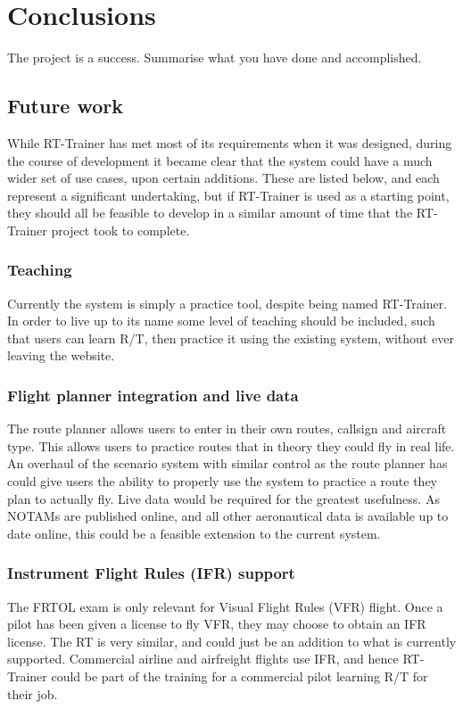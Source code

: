 \chapter{Conclusions}
\label{ch:conclusions}

The project is a success. Summarise what you have done and accomplished.


\section{Future work}
\label{FutureWork}

While RT-Trainer has met most of its requirements when it was designed, during the course of development it became clear that the system could have a much wider set of use cases, upon certain additions. These are listed below, and each represent a significant undertaking, but if RT-Trainer is used as a starting point, they should all be feasible to develop in a similar amount of time that the RT-Trainer project took to complete.

\subsection{Teaching}
Currently the system is simply a practice tool, despite being named RT-Trainer. In order to live up to its name some level of teaching should be included, such that users can learn R/T, then practice it using the existing system, without ever leaving the website.

\subsection{Flight planner integration and live data}
The route planner allows users to enter in their own routes, callsign and aircraft type. This allows users to practice routes that in theory they could fly in real life. An overhaul of the scenario system with similar control as the route planner has could give users the ability to properly use the system to practice a route they plan to actually fly. Live data would be required for the greatest usefulness. As NOTAMs are published online, and all other aeronautical data is available up to date online, this could be a feasible extension to the current system.

\subsection{Instrument Flight Rules (IFR) support}
The FRTOL exam is only relevant for Visual Flight Rules (VFR) flight. Once a pilot has been given a license to fly VFR, they may choose to obtain an IFR license. The RT is very similar, and could just be an addition to what is currently supported. Commercial airline and airfreight flights use IFR, and hence RT-Trainer could be part of the training for a commercial pilot learning R/T for their job.